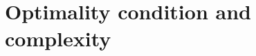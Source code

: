 \documentclass[11pt]{article}
\newcommand{\R}{\mathbb{R}}
\newcommand{\xkjtrial}{x^{k,j}_{\mathrm{trial}}}
\newcommand{\minimize}{\mathop{\text{Minimize}}}
\newtheorem{theorem}{Theorem}[section]
\newtheorem{assumption}{Assumption}
\begin{document}


\section{Optimality condition and complexity}


\end{document}
